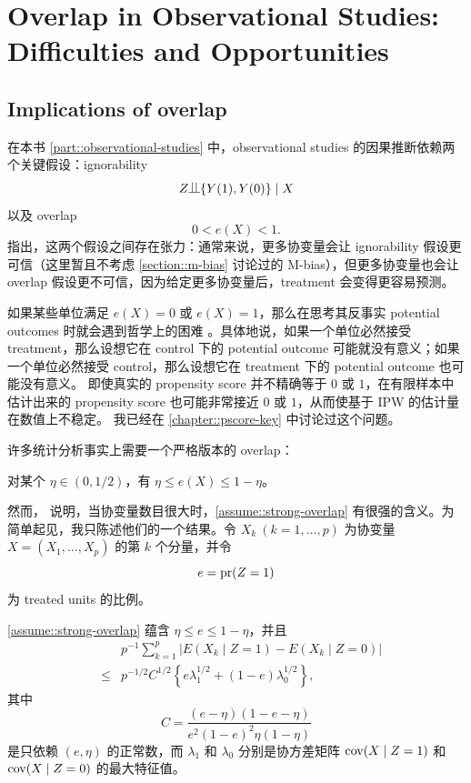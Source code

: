 
\chapter{Overlap in Observational Studies: Difficulties and Opportunities}
  \label{chapter::overlap}


 
\section{Implications of overlap}

在本书 \cref{part::observational-studies} 中，observational studies 的因果推断依赖两个关键假设：ignorability
$$
Z\ind \{ Y(1), Y(0)  \} \mid X
$$
以及 overlap
 $$
 0 <  e(X) <  1 .
 $$ 
 \citet{d2017overlap} 指出，这两个假设之间存在张力：通常来说，更多协变量会让 ignorability 假设更可信（这里暂且不考虑 \cref{section::m-bias} 讨论过的 M-bias），但更多协变量也会让 overlap 假设更不可信，因为给定更多协变量后，treatment 会变得更容易预测。

如果某些单位满足 $e(X) = 0$ 或 $e(X) = 1$，那么在思考其反事实 potential outcomes 时就会遇到哲学上的困难 \citep{king2006dangers}。具体地说，如果一个单位必然接受 treatment，那么设想它在 control 下的 potential outcome 可能就没有意义；如果一个单位必然接受 control，那么设想它在 treatment 下的 potential outcome 也可能没有意义。
即使真实的 propensity score 并不精确等于 $0$ 或 $1$，在有限样本中估计出来的 propensity score 也可能非常接近 $0$ 或 $1$，从而使基于 IPW 的估计量在数值上不稳定。
我已经在 \cref{chapter::pscore-key} 中讨论过这个问题。


许多统计分析事实上需要一个严格版本的 overlap：

\begin{assumption}
\label{assume::strong-overlap}
对某个 $\eta \in (0,1/2)$，有 $\eta \leq e(X) \leq 1-\eta$。
\end{assumption}


然而，\citet[][Corollary 1]{d2017overlap} 说明，当协变量数目很大时，\cref{assume::strong-overlap} 有很强的含义。为简单起见，我只陈述他们的一个结果。令 $X_k\ (k=1,\ldots, p)$ 为协变量 $X = (X_1, \ldots, X_p)$ 的第 $k$ 个分量，并令
$$
e= \textup{pr}(Z=1)
$$ 
为 treated units 的比例。


\begin{theorem}\label{thm::overlap-implications}
\cref{assume::strong-overlap} 蕴含 $\eta \leq e \leq 1-\eta$，并且
\begin{eqnarray} 
&&p^{-1} \sum_{k=1}^p \big | E(X_k\mid Z=1) - E(X_k\mid Z=0)  \Big |   \nonumber  \\
& \leq &  
p^{-1/2} C^{1/2}  \left\{    e\lambda_1^{1/2} + (1-e)  \lambda_0^{1/2}  \right\} , \label{eq::mean-balance-overlap}
\end{eqnarray}
其中
$$
C  = \frac{  (e-\eta)(1-e-\eta)   }{  e^2(1-e)^2 \eta (1-\eta)      }
$$
是只依赖 $(e, \eta)$ 的正常数，而 $\lambda_1$ 和 $\lambda_0$ 分别是协方差矩阵 $ \textup{cov}(X\mid Z=1)$ 和 $\textup{cov}(X\mid Z=0) $ 的最大特征值。
\end{theorem}

